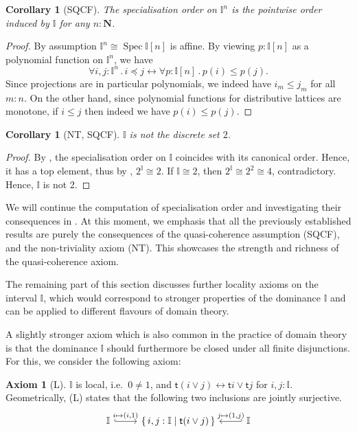 \documentclass[12pt]{amsart}
\newtheorem{corollary}[theorem]{Corollary}
\theoremstyle{definition}
\newtheorem*{axiom}{Axiom}
\newcommand{\mb}[1]{\mathbf{#1}}
\newcommand{\mbb}[1]{\mathbb{#1}}
\newcommand{\I}{\mbb I}
\newcommand{\ms}[1]{\mathsf{#1}}
\newcommand{\scomp}[2]{\{\,#1\mid#2\,\}}
\newcommand{\N}{\mb N}
\newcommand{\fa}[2]{\forall #1\!\colon\!\!#2\mathpunct{.}}
\newcommand{\eq}{\leftrightarrow}
\newcommand{\spec}{\operatorname{Spec}}
\begin{document}
\begin{corollary}[SQCF]\label{cor:pointwisecubeorder}
  The specialisation order on $\I^n$ is the pointwise order induced by $\I$ for any $n : \N$.
\end{corollary}
\begin{proof}
  By assumption $\I^n \cong \spec\I[n]$ is affine. By viewing $p : \I[n]$ as a polynomial function on $\I^n$, we have
  \[ \fa{i,j}{\I^n} i \preceq j \eq \fa p{\I[n]} p(i) \le p(j). \]
  Since projections are in particular polynomials, we indeed have $i_m \le j_m$ for all $m : n$. On the other hand, since polynomial functions for distributive lattices are monotone, if $i \le j$ then indeed we have $p(i) \le p(j)$. 
\end{proof}

\begin{corollary}[NT, SQCF]\label{cor:intisnot2}
  $\I$ is not the discrete set $2$.
\end{corollary}
\begin{proof}
  By , the specialisation order on $\I$ coincides with its canonical order. Hence, it has a top element, thus by , $2^\I \cong 2$. If $\I \cong 2$, then $2^\I \cong 2^2 \cong 4$, contradictory. Hence, $\I$ is not 2.
\end{proof}

We will continue the computation of specialisation order and investigating their consequences in . At this moment, we emphasis that all the previously established results are purely the consequences of the quasi-coherence assumption (SQCF), and the non-triviality axiom (NT). This showcases the strength and richness of the quasi-coherence axiom.

The remaining part of this section discusses further locality axioms on the interval $\I$, which would correspond to stronger properties of the dominance $\I$ and can be applied to different flavours of domain theory. 

A slightly stronger axiom which is also common in the practice of domain theory is that the dominance $\I$ should furthermore be closed under all finite disjunctions. For this, we consider the following axiom:

\begin{axiom}[L]\label{ax:L}
  $\I$ is local, i.e.\ $0 \neq 1$, and $\ms t(i\vee j) \eq \ms ti \vee \ms tj$ for $i,j : \I$. Geometrically, (L) states that the following two inclusions are jointly surjective.
  \[ 
  \begin{tikzcd}
    \I \ar[r, hook, "{i \mapsto (i,1)}"] & \scomp{i,j : \I}{\ms t(i\vee j)} & \I \ar[l, hook', "{j \mapsto (1,j)}"']
  \end{tikzcd}
  \]
\end{axiom}
\end{document}
